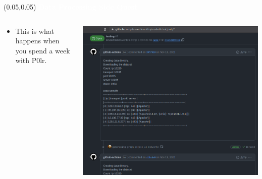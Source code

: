 \documentclass[aspectratio=169]{beamer} %
\begin{document}
\begin{frame}{}
    \setlength{\TPHorizModule}{\textwidth}
    \setlength{\TPVertModule}{\textwidth}
    \begin{textblock}{0.74}(0.05,0.05)
        \bfseries\large\textcolor{white}{Data Processing Side Quest}
    \end{textblock}

    \begin{columns}
    \begin{column}{0.5\textwidth}
 \begin{itemize}
        \item This is what happens when you spend a week with P0lr.
     \end{itemize}
    \end{column}
    \begin{column}{0.5\textwidth}
        \begin{center}
    \includegraphics[width=1.0\linewidth,height=0.7\textheight]{../images/kaggle-cml.png}
\end{center}
    \end{column}
\end{columns}

\end{frame}
\end{document}
